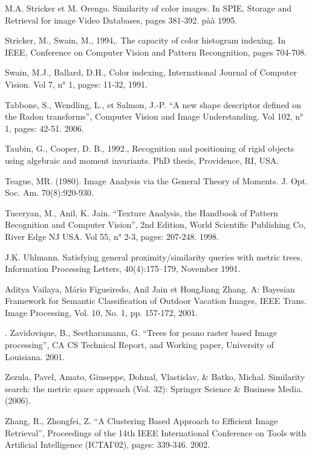 \documentclass[
openany,
11pt, %
french, %
singlespacing, %
headsepline, %
]{MastersDoctoralThesis} %
\begin{document}
\begin{thebibliography}{widest entry}
	  M.A. Stricker et M. Orengo. Similarity of color images. In SPIE, Storage
	and Retrieval for image Video Databases, pages 381-392. pàà 1995.
	
	
	  Stricker, M.,  Swain, M., 1994,. The capacity of color histogram indexing. In IEEE, Conference on Computer Vision and Pattern Recongnition, pages 704-708.
	
	  Swain, M.J., Ballard, D.H., Color indexing, International Journal of Computer
	Vision. Vol 7, n° 1, pages: 11-32, 1991.
	
	 Tabbone, S., Wendling, L., et Salmon, J.-P. “A new shape descriptor defined on the Radon transforms”, Computer Vision and Image Understanding. Vol 102, n° 1, pages: 42-51. 2006.
	
	 Taubin, G.,  Cooper, D. B., 1992., Recognition and positioning of rigid objects using algebraic and moment invariants. PhD thesis, Providence, RI, USA.
	
	 Teague, MR. (1980). Image Analysis via the General Theory of Moments.  J.
	Opt. Soc. Am. 70(8):920-930.
	
	  Tuceryan, M., Anil, K. Jain. “Texture Analysis, the Handbook of Pattern Recognition and Computer Vision”, 2nd Edition, World Scientific Publishing Co, River Edge NJ
	USA. Vol 55, n° 2-3, pages: 207-248. 1998.
	
	 J.K. Uhlmann. Satisfying general proximity/similarity queries with metric
	trees. Information Processing Letters, 40(4):175–179, November 1991.
	
	
	 Aditya Vailaya, Mário Figueiredo, Anil Jain et HongJiang Zhang. A: Bayesian Framework for Semantic Classification of Outdoor Vacation Images, IEEE Trans. Image Processing, Vol. 10, No. 1, pp. 157-172, 2001.
	
	
	. Zavidovique, B., Seetharamann, G. “Trees for peano raster based Image processing”, CA CS Technical Report, and Working paper, University of Louisiana. 2001.
	
	
	
	  Zezula, Pavel, Amato, Giuseppe, Dohnal, Vlastislav, \& Batko, Michal. Similarity search: the metric space approach (Vol. 32): Springer Science \& Business Media. (2006).
	
	 Zhang, R., Zhongfei, Z. “A Clustering Based Approach to Efficient Image Retrieval”, Proceedings of the 14th IEEE International Conference on Tools with Artificial Intelligence (ICTAI’02), pages: 339-346. 2002.
	

\end{thebibliography}
\end{document}

